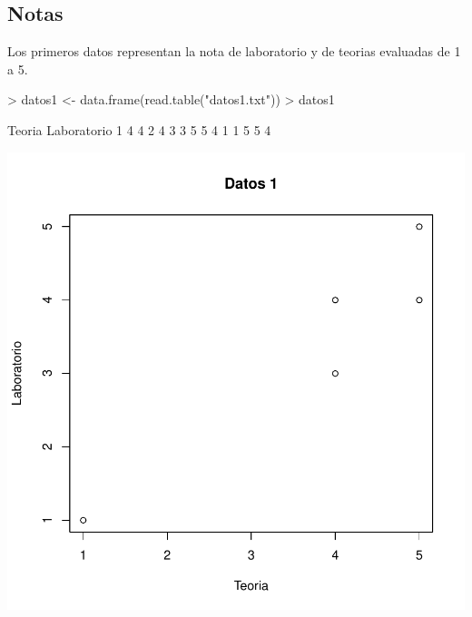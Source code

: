 \documentclass [a4paper] {article}
\begin{document}
\subsection{Notas}
Los primeros datos representan la nota de laboratorio y de teorias evaluadas de 1 a 5.
\begin{Schunk}
\begin{Sinput}
> datos1 <- data.frame(read.table("datos1.txt"))
> datos1
\end{Sinput}
\begin{Soutput}
  Teoria Laboratorio
1      4           4
2      4           3
3      5           5
4      1           1
5      5           4
\end{Soutput}
\end{Schunk}
\begin{center}
\includegraphics{entrega-plot_datos1}
\end{center}

\newpage
\end{document}

